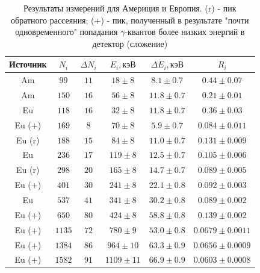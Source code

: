 \documentclass[a4paper, 12pt]{article}
\begin{document}
            \begin{table}[!ht]
                \centering
                \begin{tabular}{|c|c|c|c|c|c|}
                    \hline

                    Источник & $N_i$ & $\Delta N_i$ & $E_i, кэВ$ & $\Delta E_i, кэВ$ & $R_i$\\ \hline
                    Am & $99$ & $11$ & $18 \pm 8$ & $8.1 \pm 0.7$ & $0.44 \pm 0.07$\\ \hline
                    Am & $150$ & $16$ & $56 \pm 8$ & $11.8 \pm 0.7$ & $0.21 \pm 0.01$\\ \hline
                    Eu & $118$ & $16$ & $32 \pm 8$ & $11.8 \pm 0.7$ & $0.36 \pm 0.03$\\ \hline
                    Eu (+) & $169$ & $8$ & $70 \pm 8$ & $5.9 \pm 0.7$ & $0.084 \pm 0.011$\\ \hline
                    Eu (r) & $188$ & $15$ & $84 \pm 8$ & $11.0 \pm 0.7$ & $0.131 \pm 0.009$\\ \hline
                    Eu & $236$ & $17$ & $119 \pm 8$ & $12.5 \pm 0.7$ & $0.105 \pm 0.006$\\ \hline
                    Eu (r) & $298$ & $20$ & $165 \pm 8$ & $14.7 \pm 0.7$ & $0.089 \pm 0.005$\\ \hline
                    Eu (+) & $401$ & $30$ & $241 \pm 8$ & $22.1 \pm 0.8$ & $0.092 \pm 0.003$\\ \hline
                    Eu & $537$ & $41$ & $341 \pm 8$ & $30.2 \pm 0.8$ & $0.089 \pm 0.002$\\ \hline
                    Eu (+) & $650$ & $80$ & $424 \pm 8$ & $58.8 \pm 0.8$ & $0.139 \pm 0.002$\\ \hline
                    Eu (+) & $1135$ & $72$ & $780 \pm 9$ & $53.0 \pm 0.8$ & $0.0679 \pm 0.0011$\\ \hline
                    Eu (+) & $1384$ & $86$ & $964 \pm 10$ & $63.3 \pm 0.9$ & $0.0656 \pm 0.0009$\\ \hline
                    Eu (+) & $1582$ & $91$ & $1109 \pm 11$ & $66.9 \pm 0.9$ & $0.0603 \pm 0.0008$\\ \hline

                \end{tabular}
                \caption{Результаты измерений для Америция и Европия. (r) - пик обратного рассеяния; (+) - пик, полученный в результате "почти одновременного" попадания $\gamma$-квантов более низких энергий в детектор (сложение)}
                \label{tab:am_eu_res}
            \end{table}
\end{document}
